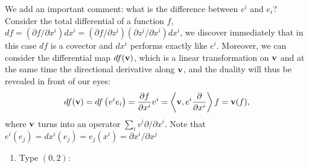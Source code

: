 We add an important comment: what is the difference between $e^i$ and $e_i$? Consider the total differential of a function $f$, $df = (\partial f/ \partial x^i) dx^i = (\partial f/ \partial z^j)(\partial z^j/ \partial x^i) dx^i$, we discover immediately that in this case $df$ is a covector and $dx^i$ performs exactly like $e^i$. Moreover, we can consider the differential map $df(\mathbf{v})$, which is a linear transformation on $\mathbf{v}$ and at the same time the directional derivative along $\mathbf{v}$, and the duality will thus be revealed in front of our eyes:
\[ df(\mathbf{v}) = df\left( v^i e_i \right) = \frac{ \partial f}{ \partial x^i } v^i = \left< \mathbf{v}, e^i\frac{ \partial }{ \partial x^i } \right>f= \mathbf{v}(f), \]
where $\mathbf{v}$ turns into an operator $\sum_i v^i \partial/\partial x^i$. Note that $e^i(e_j) = dx^i(e_j) = e_j(x^i) = \partial x^i/ \partial x^j$

\begin{example}
	\begin{enumerate}
		\item Type $(0, 2)$: 
	\end{enumerate}
\end{example}
